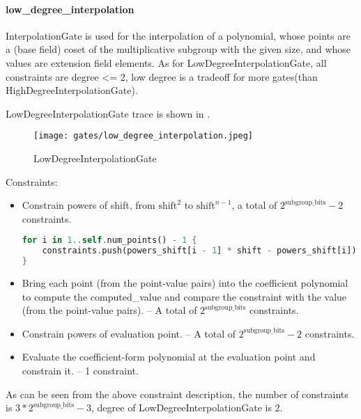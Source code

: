 \paragraph{low\_degree\_interpolation}

InterpolationGate is used for the interpolation of a polynomial, whose points are a (base field) coset of the multiplicative subgroup 
with the given size, and whose values are extension field elements. As for LowDegreeInterpolationGate,  all constraints are degree <= 2, 
low degree is a tradeoff for more gates(than HighDegreeInterpolationGate).

LowDegreeInterpolationGate trace is shown in .

\begin{figure}[!ht]
    \centering
    \texttt{[image: gates/low\_degree\_interpolation.jpeg]}
    \caption{LowDegreeInterpolationGate}
    \label{fig:low-degree-interpolation}
\end{figure}

Constraints:
\begin{itemize}
    \item Constrain powers of shift, from $\text{shift}^2$ to $\text{shift}^{n-1}$, a total of $2^{\text{subgroup\_bits}}-2$ constraints.
    \begin{lstlisting}[language=rust]
for i in 1..self.num_points() - 1 {
    constraints.push(powers_shift[i - 1] * shift - powers_shift[i]);
}
    \end{lstlisting}
    \item Bring each point (from the point-value pairs) into the coefficient polynomial to compute the computed\_value 
    and compare the constraint with the value (from the point-value pairs). -- A total of $2^{\text{subgroup\_bits}}$ constraints.
    \item Constrain powers of evaluation point. -- A total of $2^{\text{subgroup\_bits}}-2$ constraints.
    \item Evaluate the coefficient-form polynomial at the evaluation point and constrain it. -- 1 constraint.
\end{itemize}

As can be seen from the above constraint description, the number of constraints is $3*2^{\text{subgroup\_bits}}-3$, degree of LowDegreeInterpolationGate is 2.
